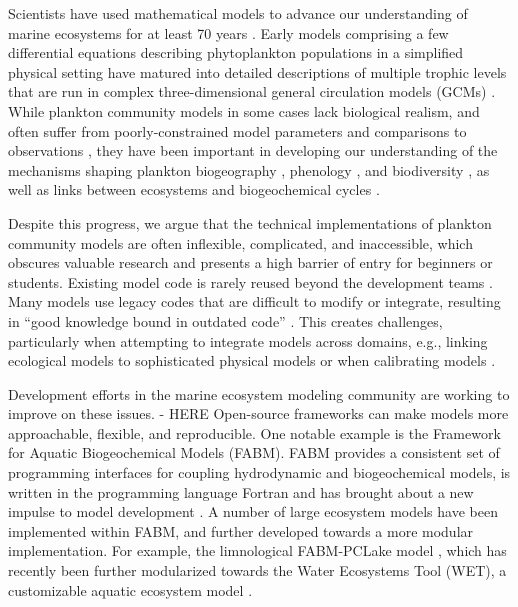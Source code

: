 \documentclass[journal abbreviation, manuscript]{copernicus}
\begin{document}
Scientists have used mathematical models to advance our understanding of marine ecosystems for at least 70 years \citep{Sverdrup1953OnPhytoplankton, Fasham1990a, Gentleman2002a, Follows2007EmergentOcean, Acevedo-Trejos2016}. Early models comprising a few differential equations describing phytoplankton populations in a simplified physical setting \citep{Evans1985ACycles, Fasham1990a} have matured into detailed descriptions of multiple trophic levels that are run in complex three-dimensional general circulation models (GCMs) \citep[e.g.][]{Dutkiewicz2020DimensionsDiversity}. While plankton community models in some cases lack biological realism, and often suffer from poorly-constrained model parameters and comparisons to observations \citep{Anderson2005}, they have been important in developing our understanding of the mechanisms shaping plankton biogeography \citep[e.g.][]{Follows2007EmergentOcean}, phenology \citep[e.g.][]{Taylor1993SeasonalNitrogen}, and biodiversity \citep[e.g.][]{Barton2010b, Acevedo-Trejos2015c}, as well as links between ecosystems and biogeochemical cycles \citep[e.g.][]{Fasham1990a, Sarmiento1998SimulatedWarming, Merico2006IsSystem, Dutkiewicz2009}.

Despite this progress, we argue that the technical implementations of plankton community models are often inflexible, complicated, and inaccessible, which obscures valuable research and presents a high barrier of entry for beginners or students. Existing model code is rarely reused beyond the development teams \citep{Belete2017AnTesting}. Many models use legacy codes that are difficult to modify or integrate, resulting in “good knowledge bound in outdated code” \citep{Argent2004AnSemantics}. This creates challenges, particularly when attempting to integrate models across domains, e.g., linking ecological models to sophisticated physical models \citep{Koralewski2019CouplingModels} or when calibrating models \citep{Steenbeek2021MakingPerspective}. 


Development efforts in the marine ecosystem modeling community are working to improve on these issues.
- HERE
Open-source frameworks can make models more approachable, flexible, and reproducible. One notable example is the Framework for Aquatic Biogeochemical Models (FABM). FABM provides a consistent set of programming interfaces for coupling hydrodynamic and biogeochemical models, is written in the programming language Fortran and has brought about a new impulse to model development \citep{Bruggeman2014a}. A number of large ecosystem models have been implemented within FABM, and further developed towards a more modular implementation. For example, the limnological FABM-PCLake model \citep{Hu2016FABM-PCLakeHydrodynamics}, which has recently been further modularized towards the Water Ecosystems Tool (WET), a customizable aquatic ecosystem model \citep[][]{Schnedler-Meyer2022WaterModel}. 
\end{document}

